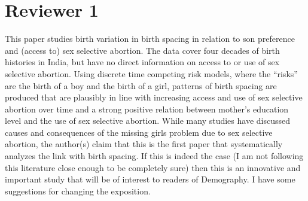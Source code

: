 \documentclass[letterpaper,12pt]{article}
\begin{document}
\newpage

\section*{Reviewer 1}

This paper studies birth variation in birth spacing in relation to son
preference and (access to) sex selective abortion. The data cover four
decades of birth histories in India, but have no direct information on
access to or use of sex selective abortion. Using discrete time
competing risk models, where the “risks” are the birth of a boy and the
birth of a girl, patterns of birth spacing are produced that are
plausibly in line with increasing access and use of sex selective
abortion over time and a strong positive relation between mother’s
education level and the use of sex selective abortion. While many
studies have discussed causes and consequences of the missing girls
problem due to sex selective abortion, the author(s) claim that this is
the first paper that systematically analyzes the link with birth
spacing. If this is indeed the case (I am not following this literature
close enough to be completely sure) then this is an innovative and
important study that will be of interest to readers of Demography. I
have some suggestions for changing the exposition.
\end{document}
